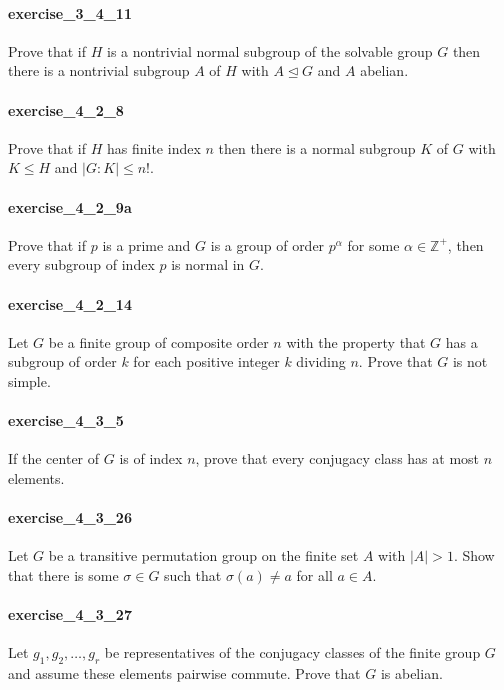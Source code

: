 \documentclass{article}
\begin{document}
\paragraph{exercise\_3\_4\_11} Prove that if $H$ is a nontrivial normal subgroup of the solvable group $G$ then there is a nontrivial subgroup $A$ of $H$ with $A \unlhd G$ and $A$ abelian.

\paragraph{exercise\_4\_2\_8} Prove that if $H$ has finite index $n$ then there is a normal subgroup $K$ of $G$ with $K \leq H$ and $|G: K| \leq n!$.

\paragraph{exercise\_4\_2\_9a} Prove that if $p$ is a prime and $G$ is a group of order $p^{\alpha}$ for some $\alpha \in \mathbb{Z}^{+}$, then every subgroup of index $p$ is normal in $G$.

\paragraph{exercise\_4\_2\_14} Let $G$ be a finite group of composite order $n$ with the property that $G$ has a subgroup of order $k$ for each positive integer $k$ dividing $n$. Prove that $G$ is not simple.

\paragraph{exercise\_4\_3\_5} If the center of $G$ is of index $n$, prove that every conjugacy class has at most $n$ elements.

\paragraph{exercise\_4\_3\_26} Let $G$ be a transitive permutation group on the finite set $A$ with $|A|>1$. Show that there is some $\sigma \in G$ such that $\sigma(a) \neq a$ for all $a \in A$.

\paragraph{exercise\_4\_3\_27} Let $g_{1}, g_{2}, \ldots, g_{r}$ be representatives of the conjugacy classes of the finite group $G$ and assume these elements pairwise commute. Prove that $G$ is abelian.
\end{document}
